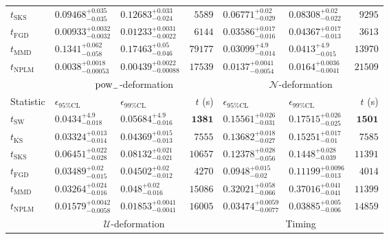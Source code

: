 \begin{tabular}{l|llr|llr}
	$t_{\mathrm{SKS}}$ & $0.09468_{-0.035}^{+0.035}$ & $0.12683_{-0.024}^{+0.033}$ & $5589$ & $0.06771_{-0.029}^{+0.02}$ & $0.08308_{-0.022}^{+0.02}$ & $9295$ \\
	$t_{\mathrm{FGD}}$ & ${\mathbf{0.00933_{-0.0032}^{+0.0032}}}$ & ${\mathbf{0.01233_{-0.0022}^{+0.0031}}}$ & $6144$ & $0.03586_{-0.016}^{+0.017}$ & $0.04367_{-0.013}^{+0.017}$ & $3613$ \\
	$t_{\mathrm{MMD}}$ & $0.1341_{-0.058}^{+0.062}$ & $0.17463_{-0.046}^{+0.05}$ & $79177$ & ${\mathbf{0.03099_{-0.014}^{+4.9}}}$ & ${\mathbf{0.0413_{-0.015}^{+4.9}}}$ & $13970$ \\
\rowcolor{red!35}	$t_{\mathrm{NPLM}}$ & $0.0038_{-0.00053}^{+0.0018}$ & $0.00439_{-0.00088}^{+0.0022}$ & $17539$ & $0.0137_{-0.0054}^{+0.0041}$ & $0.0164_{-0.0041}^{+0.0036}$ & $21509$ \\
	\toprule
	\multicolumn{1}{c}{} & \multicolumn{3}{c}{$\rm{pow}_{-}$-deformation} & \multicolumn{3}{c}{$\mathcal{N}$-deformation} \\
Statistic & $\epsilon_{95\%\mathrm{CL}}$ & $\epsilon_{99\%\mathrm{CL}}$ & $t$ (s) & $\epsilon_{95\%\mathrm{CL}}$ & $\epsilon_{99\%\mathrm{CL}}$ & $t$ (s) \\
	\midrule
	$t_{\mathrm{SW}}$ & $0.0434_{-0.018}^{+4.9}$ & $0.05684_{-0.016}^{+4.9}$ & ${\mathbf{1381}}$ & $0.15561_{-0.031}^{+0.026}$ & $0.17515_{-0.025}^{+0.026}$ & ${\mathbf{1501}}$ \\
	$t_{\overline{\mathrm{KS}}}$ & $0.03324_{-0.014}^{+0.013}$ & ${\mathbf{0.04369_{-0.013}^{+0.015}}}$ & $7555$ & $0.13682_{-0.027}^{+0.018}$ & $0.15251_{-0.01}^{+0.017}$ & $7585$ \\
	$t_{\mathrm{SKS}}$ & $0.06451_{-0.028}^{+0.022}$ & $0.08132_{-0.021}^{+0.021}$ & $10657$ & $0.12378_{-0.056}^{+0.028}$ & $0.1448_{-0.039}^{+0.028}$ & $11391$ \\
	$t_{\mathrm{FGD}}$ & $0.03489_{-0.015}^{+0.02}$ & $0.04502_{-0.012}^{+0.02}$ & $4270$ & ${\mathbf{0.0948_{-0.02}^{+0.015}}}$ & ${\mathbf{0.11199_{-0.013}^{+0.0096}}}$ & $4014$ \\
	$t_{\mathrm{MMD}}$ & ${\mathbf{0.03264_{-0.016}^{+0.024}}}$ & $0.048_{-0.016}^{+0.02}$ & $15086$ & $0.32021_{-0.066}^{+0.058}$ & $0.37016_{-0.041}^{+0.041}$ & $11399$ \\
\rowcolor{red!35}	$t_{\mathrm{NPLM}}$ & $0.01579_{-0.0058}^{+0.0042}$ & $0.01853_{-0.0041}^{+0.0041}$ & $16005$ & $0.03474_{-0.0077}^{+0.0059}$ & $0.03885_{-0.006}^{+0.005}$ & $14859$ \\
	\toprule
	\multicolumn{1}{c}{} & \multicolumn{3}{c}{$\mathcal{U}$-deformation} & \multicolumn{3}{c}{Timing} \\

\end{tabular}
